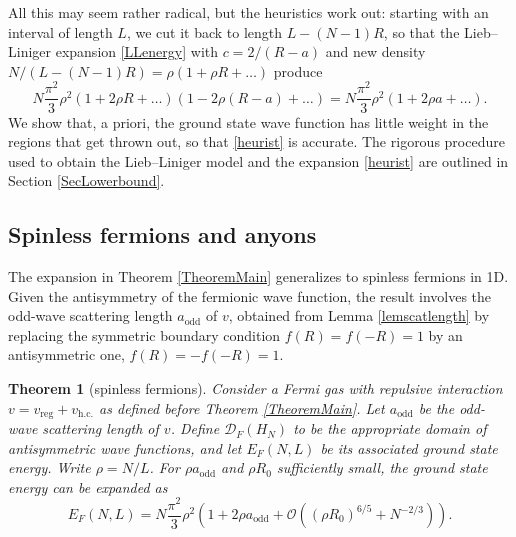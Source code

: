 \documentclass[a4paper,11pt]{article}
\newtheorem{theorem}{Theorem}
\numberwithin{equation}{section}
\begin{document}
	All this may seem rather radical, but the heuristics work out: starting with an interval of length $L$, we cut it back to length $L-(N-1)R$, so that the Lieb--Liniger expansion \eqref{LLenergy} with $c=2/(R-a)$ and new density $N/(L-(N-1)R)=\rho(1+\rho R+\dots)$ produce
	\begin{equation}
		\label{heurist}
		N\frac{\pi^2}{3}\rho^2(1+2\rho R+\dots)(1-2\rho(R-a)+\dots)=N\frac{\pi^2}{3}\rho^2(1+2\rho a+\dots).
	\end{equation}
	We show that, a priori, the ground state wave function has little weight in the regions that get thrown out, so that \eqref{heurist} is accurate. The rigorous procedure used to obtain the Lieb--Liniger model and the expansion \eqref{heurist} are outlined in Section \ref{SecLowerbound}. 
	
	
	
	
	\subsection{Spinless fermions and anyons}
	\label{SecOthersymmetries}
	The expansion in Theorem \ref{TheoremMain} generalizes to spinless fermions in 1D. Given the antisymmetry of the fermionic wave function, the result involves the odd-wave scattering length $a_{\text{odd}}$ of $v$, obtained from Lemma \ref{lemscatlength} by replacing the symmetric boundary condition $f(R)=f(-R)=1$ by an antisymmetric one, $f(R)=-f(-R)=1$.
	\begin{theorem}[spinless fermions]\label{TheoremFermion}
		Consider a Fermi gas with repulsive interaction  $v=v_{\text{reg}}+v_{\text{h.c.}}$ as defined before Theorem \ref{TheoremMain}. Let  $a_{\text{odd}}$ be the odd-wave scattering length of $v$. Define $\mathcal{D}_F(H_N)$ to be the appropriate domain of antisymmetric wave functions, and let $ E_F(N,L)$ be its associated ground state energy. Write $\rho=N/L$. For $\rho a_{\text{odd}}$ and $\rho R_0$ sufficiently small, the ground state energy can be expanded as 
		\begin{equation}
			E_F(N,L)=N\frac{\pi^2}{3}\rho^2\left(1+2\rho a_{\text{odd}}+\mathcal{O}\left(\left(\rho R_0\right)^{6/5}+N^{-2/3}\right)\right).
		\end{equation}
	\end{theorem}
	
\end{document}
